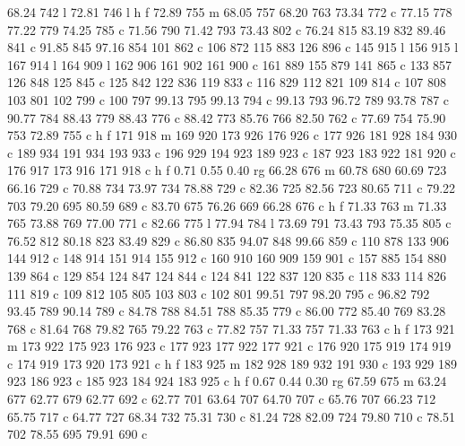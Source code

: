 {{        68.24 742 l
        72.81 746 l
        h f
        72.89 755 m
        68.05 757 68.20 763 73.34 772 c
        77.15 778 77.22 779 74.25 785 c
        71.56 790 71.42 793 73.43 802 c
        76.24 815 83.19 832 89.46 841 c
        91.85 845 97.16 854 101 862 c
        106 872 115 883 126 896 c
        145 915 l
        156 915 l
        167 914 l
        164 909 l
        162 906 161 902 161 900 c
        161 889 155 879 141 865 c
        133 857 126 848 125 845 c
        125 842 122 836 119 833 c
        116 829 112 821 109 814 c
        107 808 103 801 102 799 c
        100 797 99.13 795 99.13 794 c
        99.13 793 96.72 789 93.78 787 c
        90.77 784 88.43 779 88.43 776 c
        88.42 773 85.76 766 82.50 762 c
        77.69 754 75.90 753 72.89 755 c
        h f
        171 918 m
        169 920 173 926 176 926 c
        177 926 181 928 184 930 c
        189 934 191 934 193 933 c
        196 929 194 923 189 923 c
        187 923 183 922 181 920 c
        176 917 173 916 171 918 c
        h f
        0.71 0.55 0.40 rg
        66.28 676 m
        60.78 680 60.69 723 66.16 729 c
        70.88 734 73.97 734 78.88 729 c
        82.36 725 82.56 723 80.65 711 c
        79.22 703 79.20 695 80.59 689 c
        83.70 675 76.26 669 66.28 676 c
        h f
        71.33 763 m
        71.33 765 73.88 769 77.00 771 c
        82.66 775 l
        77.94 784 l
        73.69 791 73.43 793 75.35 805 c
        76.52 812 80.18 823 83.49 829 c
        86.80 835 94.07 848 99.66 859 c
        110 878 133 906 144 912 c
        148 914 151 914 155 912 c
        160 910 160 909 159 901 c
        157 885 154 880 139 864 c
        129 854 124 847 124 844 c
        124 841 122 837 120 835 c
        118 833 114 826 111 819 c
        109 812 105 805 103 803 c
        102 801 99.51 797 98.20 795 c
        96.82 792 93.45 789 90.14 789 c
        84.78 788 84.51 788 85.35 779 c
        86.00 772 85.40 769 83.28 768 c
        81.64 768 79.82 765 79.22 763 c
        77.82 757 71.33 757 71.33 763 c
        h f
        173 921 m
        173 922 175 923 176 923 c
        177 923 177 922 177 921 c
        176 920 175 919 174 919 c
        174 919 173 920 173 921 c
        h f
        183 925 m
        182 928 189 932 191 930 c
        193 929 189 923 186 923 c
        185 923 184 924 183 925 c
        h f
        0.67 0.44 0.30 rg
        67.59 675 m
        63.24 677 62.77 679 62.77 692 c
        62.77 701 63.64 707 64.70 707 c
        65.76 707 66.23 712 65.75 717 c
        64.77 727 68.34 732 75.31 730 c
        81.24 728 82.09 724 79.80 710 c
        78.51 702 78.55 695 79.91 690 c
}}
